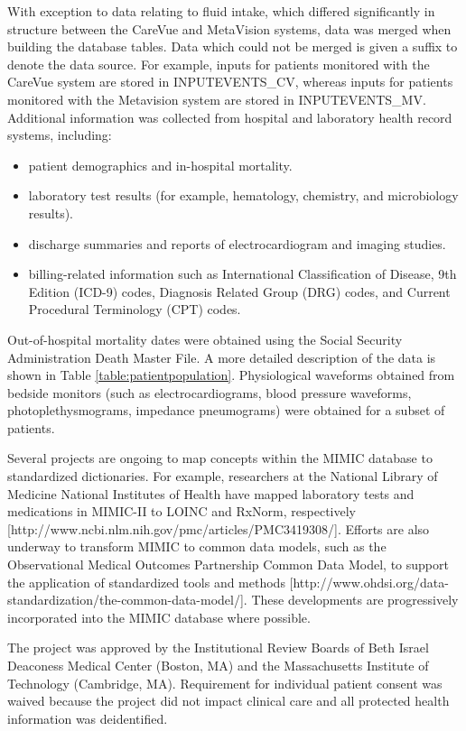 \documentclass[english]{article}
\begin{document}
With exception to data relating to fluid intake, which differed significantly in structure between the CareVue and MetaVision systems, data was merged when building the database tables. Data which could not be merged is given a suffix to denote the data source. For example, inputs for patients monitored with the CareVue system are stored in INPUTEVENTS\_CV, whereas inputs for patients monitored with the Metavision system are stored in INPUTEVENTS\_MV. Additional information was collected from hospital and laboratory health record systems, including:
\begin{itemize}
  \item patient demographics and in-hospital mortality.
  \item laboratory test results (for example, hematology, chemistry, and microbiology results).
  \item discharge summaries and reports of electrocardiogram and imaging studies.
  \item billing-related information such as International Classification of Disease, 9th Edition (ICD-9) codes, Diagnosis Related Group (DRG) codes, and Current Procedural Terminology (CPT) codes.
\end{itemize}
Out-of-hospital mortality dates were obtained using the Social Security Administration Death Master File. A more detailed description of the data is shown in Table \ref{table:patientpopulation}. Physiological waveforms obtained from bedside monitors (such as electrocardiograms, blood pressure waveforms, photoplethysmograms, impedance pneumograms) were obtained for a subset of patients. 

Several projects are ongoing to map concepts within the MIMIC database to standardized dictionaries. For example, researchers at the National Library of Medicine National Institutes of Health have mapped laboratory tests and medications in MIMIC-II to LOINC and RxNorm, respectively [http://www.ncbi.nlm.nih.gov/pmc/articles/PMC3419308/]. Efforts are also underway to transform MIMIC to common data models, such as the Observational Medical Outcomes Partnership Common Data Model, to support the application of standardized tools and methods [http://www.ohdsi.org/data-standardization/the-common-data-model/]. These developments are progressively incorporated into the MIMIC database where possible.

The project was approved by the Institutional Review Boards of Beth Israel Deaconess Medical Center (Boston, MA) and the Massachusetts Institute of Technology (Cambridge, MA). Requirement for individual patient consent was waived because the project did not impact clinical care and all protected health information was deidentified.
\end{document}
